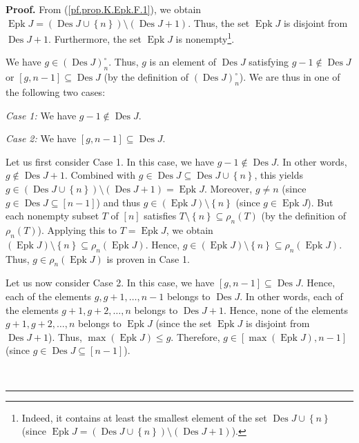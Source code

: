 \documentclass[numbers=enddot,12pt,final,onecolumn,notitlepage]{scrartcl}%
\theoremstyle{definition}
\newenvironment{proof}[1][Proof]{\noindent\textbf{#1.} }{\ \rule{0.5em}{0.5em}}
\newenvironment{verlong}{}{}
\begin{document}
\begin{verlong}
\begin{proof}
From (\ref{pf.prop.K.Epk.F.1}), we obtain $\operatorname*{Epk}J=\left(
\operatorname*{Des}J\cup\left\{  n\right\}  \right)  \setminus\left(
\operatorname*{Des}J+1\right)  $. Thus, the set $\operatorname*{Epk}J$ is
disjoint from $\operatorname*{Des}J+1$. Furthermore, the set
$\operatorname*{Epk}J$ is nonempty\footnote{Indeed, it contains at least the
smallest element of the set $\operatorname*{Des}J\cup\left\{  n\right\}  $
(since $\operatorname*{Epk}J=\left(  \operatorname*{Des}J\cup\left\{
n\right\}  \right)  \setminus\left(  \operatorname*{Des}J+1\right)  $).}.

We have $g\in\left(  \operatorname*{Des}J\right)  _{n}^{\circ}$. Thus, $g$ is
an element of $\operatorname*{Des}J$ satisfying $g-1\notin\operatorname*{Des}%
J$ or $\left[  g,n-1\right]  \subseteq\operatorname*{Des}J$ (by the definition
of $\left(  \operatorname*{Des}J\right)  _{n}^{\circ}$). We are thus in one of
the following two cases:

\textit{Case 1:} We have $g-1\notin\operatorname*{Des}J$.

\textit{Case 2:} We have $\left[  g,n-1\right]  \subseteq\operatorname*{Des}J$.

Let us first consider Case 1. In this case, we have $g-1\notin%
\operatorname*{Des}J$. In other words, $g\notin\operatorname*{Des}J+1$.
Combined with $g\in\operatorname*{Des}J\subseteq\operatorname*{Des}%
J\cup\left\{  n\right\}  $, this yields $g\in\left(  \operatorname*{Des}%
J\cup\left\{  n\right\}  \right)  \setminus\left(  \operatorname*{Des}%
J+1\right)  =\operatorname*{Epk}J$. Moreover, $g\neq n$ (since $g\in
\operatorname*{Des}J\subseteq\left[  n-1\right]  $) and thus $g\in\left(
\operatorname*{Epk}J\right)  \setminus\left\{  n\right\}  $ (since
$g\in\operatorname*{Epk}J$). But each nonempty subset $T$ of $\left[
n\right]  $ satisfies $T\setminus\left\{  n\right\}  \subseteq\rho_{n}\left(
T\right)  $ (by the definition of $\rho_{n}\left(  T\right)  $). Applying this
to $T=\operatorname*{Epk}J$, we obtain $\left(  \operatorname*{Epk}J\right)
\setminus\left\{  n\right\}  \subseteq\rho_{n}\left(  \operatorname*{Epk}%
J\right)  $. Hence, $g\in\left(  \operatorname*{Epk}J\right)  \setminus
\left\{  n\right\}  \subseteq\rho_{n}\left(  \operatorname*{Epk}J\right)  $.
Thus, $g\in\rho_{n}\left(  \operatorname*{Epk}J\right)  $ is proven in Case 1.

Let us now consider Case 2. In this case, we have $\left[  g,n-1\right]
\subseteq\operatorname*{Des}J$. Hence, each of the elements $g,g+1,\ldots,n-1$
belongs to $\operatorname*{Des}J$. In other words, each of the elements
$g+1,g+2,\ldots,n$ belongs to $\operatorname*{Des}J+1$. Hence, none of the
elements $g+1,g+2,\ldots,n$ belongs to $\operatorname*{Epk}J$ (since the set
$\operatorname*{Epk}J$ is disjoint from $\operatorname*{Des}J+1$). Thus,
$\max\left(  \operatorname*{Epk}J\right)  \leq g$. Therefore, $g\in\left[
\max\left(  \operatorname*{Epk}J\right)  ,n-1\right]  $ (since $g\in
\operatorname*{Des}J\subseteq\left[  n-1\right]  $).


\end{proof}
\end{verlong}
\end{document}
